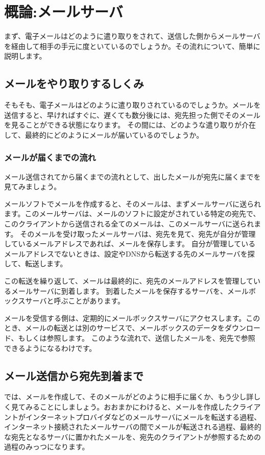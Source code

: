 \chapter{概論:メールサーバ}

まず、電子メールはどのように遣り取りをされて、送信した側からメールサーバを経由して相手の手元に度といているのでしょうか。その流れについて、簡単に説明します。

\section{メールをやり取りするしくみ}

そもそも、電子メールはどのように遣り取りされているのでしょうか。メールを送信すると、早ければすぐに、遅くても数分後には、宛先担った側でそのメールを見ることができる状態になります。
その間には、どのような遣り取りが介在して、最終的にどのようにメールが届いているのでしょうか。

\subsection{メールが届くまでの流れ}

メール送信されてから届くまでの流れとして、出したメールが宛先に届くまでを見てみましょう。

メールソフトでメールを作成すると、そのメールは、まずメールサーバに送られます。このメールサーバは、メールのソフトに設定がされている特定の宛先で、このクライアントから送信される全てのメールは、このメールサーバに送られます。
そのメールを受け取ったメールサーバは、宛先を見て、宛先が自分が管理しているメールアドレスであれば、メールを保存します。
自分が管理しているメールアドレスでないときは、設定やDNSから転送する先のメールサーバを探して、転送します。

この転送を繰り返して、メールは最終的に、宛先のメールアドレスを管理しているメールサーバに到着します。
到着したメールを保存するサーバを、メールボックスサーバと呼ぶことがあります。

メールを受信する側は、定期的にメールボックスサーバにアクセスします。このとき、メールの転送とは別のサービスで、メールボックスのデータをダウンロード、もしくは参照します。
このような流れで、送信したメールを、宛先で参照できるようになるわけです。

\section{メール送信から宛先到着まで}

では、メールを作成して、そのメールがどのように相手に届くか、もう少し詳しく見てみることにしましょう。おおまかにわけると、メールを作成したクライアントがインターネットプロバイダなどのメールサーバにメールを転送する過程、インターネット接続されたメールサーバの間でメールが転送される過程、最終的な宛先となるサーバに置かれたメールを、宛先のクライアントが参照するための過程のみっつになります。

